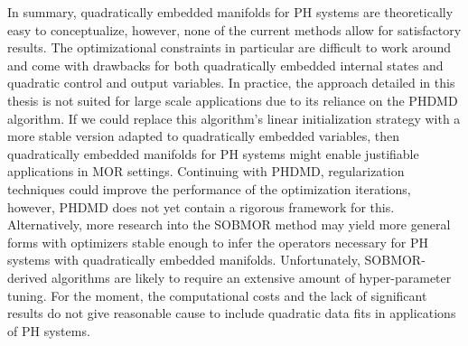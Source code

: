 In summary, quadratically embedded manifolds for \ac{PH} systems are theoretically easy to conceptualize, however, none of the current methods allow for satisfactory results.
The optimizational constraints in particular are difficult to work around and come with drawbacks for both quadratically embedded internal states and quadratic control and output variables.
In practice, the approach detailed in this thesis is not suited for large scale applications due to its reliance on the \ac{PHDMD} algorithm.
If we could replace this algorithm's linear initialization strategy with a more stable version adapted to quadratically embedded variables, then quadratically embedded manifolds for \ac{PH} systems might enable justifiable applications in \ac{MOR} settings.
Continuing with \ac{PHDMD}, regularization techniques could improve the performance of the optimization iterations, however, \ac{PHDMD} does not yet contain a rigorous framework for this.
Alternatively, more research into the \ac{SOBMOR} method may yield more general forms with optimizers stable enough to infer the operators necessary for \ac{PH} systems with quadratically embedded manifolds.
Unfortunately, \ac{SOBMOR}-derived algorithms are likely to require an extensive amount of hyper-parameter tuning.
For the moment, the computational costs and the lack of significant results do not give reasonable cause to include quadratic data fits in applications of \ac{PH} systems.
